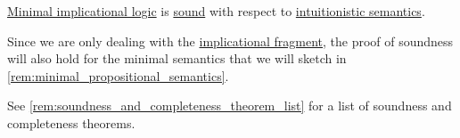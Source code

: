 \begin{theorem}\label{thm:minimal_implicational_logic_soundness}
  \hyperref[def:minimal_implication_logic]{Minimal implicational logic} is \hyperref[def:general_logic]{sound} with respect to \hyperref[def:propositional_semantics]{intuitionistic semantics}.
\end{theorem}
\begin{comments}
  \item Since we are only dealing with the \hyperref[def:implicational_propositional_fragment]{implicational fragment}, the proof of soundness will also hold for the minimal semantics that we will sketch in \cref{rem:minimal_propositional_semantics}.

  \item See \cref{rem:soundness_and_completeness_theorem_list} for a list of soundness and completeness theorems.
\end{comments}
